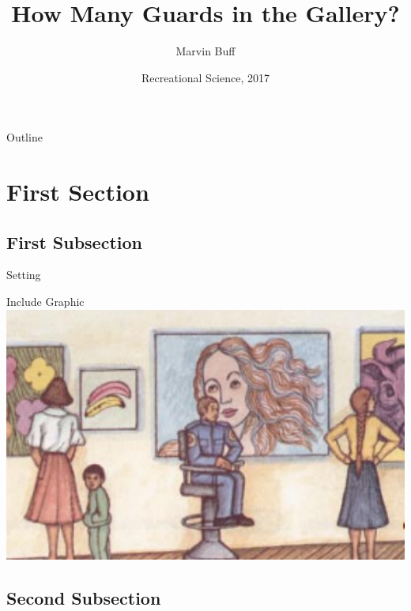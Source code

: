 \documentclass{beamer}
\title{How Many Guards in the Gallery?}
\author{Marvin Buff}
\institute{University of Basel}
\date{Recreational Science, 2017}
\begin{document}
\begin{frame}
  \titlepage
\end{frame}

\begin{frame}{Outline}
  \tableofcontents%
\end{frame}


\section{First Section}
\subsection{First Subsection}%

\begin{frame}{Setting}
    \begin{block}{Include Graphic}
        \includegraphics[width=1\textwidth]{guard} 
    \end{block}   
\end{frame}

\subsection{Second Subsection}
\end{document}
